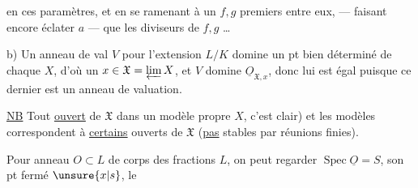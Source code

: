 en ces paramètres, et en se ramenant à un $f,g$ premiers entre eux,  --- faisant encore éclater $a$ --- que les diviseurs de $f,g$  \ldots

b) Un anneau de val $V$  pour l'extension $L/K$ domine un pt bien déterminé de chaque $X$, d'où un $x\in\mathfrak X=\varprojlim X$, et $V$ domine $\underline{O}_{\mathfrak X,x}$, donc lui est égal puisque ce dernier est un anneau de valuation.

\uline{NB} Tout  \uline{ouvert} de $\mathfrak X$    dans un modèle propre $X$, c'est clair) et  les modèles correspondent à \uline{certains} ouverts de $\mathfrak X$ (\uline{pas} stables par réunions finies).

Pour  anneau   $O\subset L$ de corps des fractions $L$, on peut regarder $\operatorname{Spec}\underline{O}=S$, son pt fermé $\unsure{x|s}$, le 
